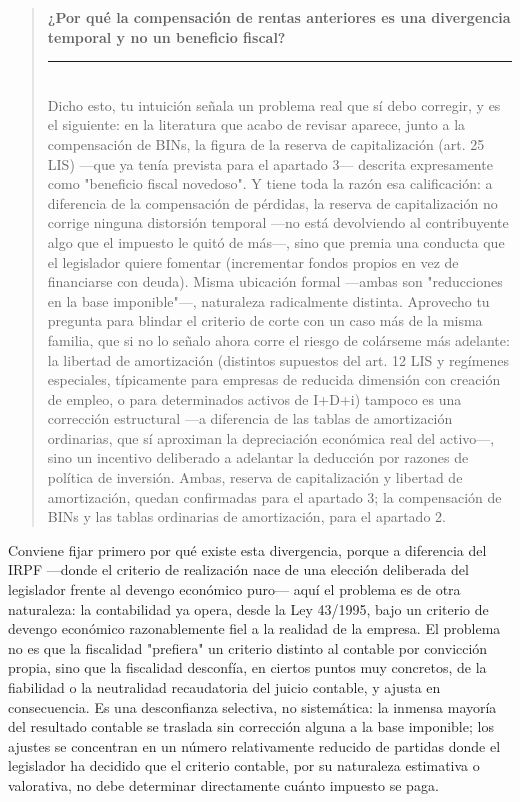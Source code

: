 \documentclass[10pt,a4paper]{article}
\newenvironment{specialblock}[1]{%
      \begin{quote} %
      \small %
      \noindent\textbf{#1}\\[-0.3em] %
      \rule{\linewidth}{0.4pt}\\[0.6em]}{
      \end{quote}}
\begin{document}
\begin{specialblock}{¿Por qué la compensación de rentas anteriores es una divergencia temporal y no un beneficio fiscal?}
    Dicho esto, tu intuición señala un problema real que sí debo corregir, y es el siguiente: en la literatura que acabo de revisar aparece, junto a la compensación de BINs, la figura de la reserva de capitalización (art. 25 LIS) —que ya tenía prevista para el apartado 3— descrita expresamente como "beneficio fiscal novedoso". Y tiene toda la razón esa calificación: a diferencia de la compensación de pérdidas, la reserva de capitalización no corrige ninguna distorsión temporal —no está devolviendo al contribuyente algo que el impuesto le quitó de más—, sino que premia una conducta que el legislador quiere fomentar (incrementar fondos propios en vez de financiarse con deuda). Misma ubicación formal —ambas son "reducciones en la base imponible"—, naturaleza radicalmente distinta. Aprovecho tu pregunta para blindar el criterio de corte con un caso más de la misma familia, que si no lo señalo ahora corre el riesgo de colárseme más adelante: la libertad de amortización (distintos supuestos del art. 12 LIS y regímenes especiales, típicamente para empresas de reducida dimensión con creación de empleo, o para determinados activos de I+D+i) tampoco es una corrección estructural —a diferencia de las tablas de amortización ordinarias, que sí aproximan la depreciación económica real del activo—, sino un incentivo deliberado a adelantar la deducción por razones de política de inversión. Ambas, reserva de capitalización y libertad de amortización, quedan confirmadas para el apartado 3; la compensación de BINs y las tablas ordinarias de amortización, para el apartado 2.
\end{specialblock}


Conviene fijar primero por qué existe esta divergencia, porque a diferencia del IRPF —donde el criterio de realización nace de una elección deliberada del legislador frente al devengo económico puro— aquí el problema es de otra naturaleza: la contabilidad ya opera, desde la Ley 43/1995, bajo un criterio de devengo económico razonablemente fiel a la realidad de la empresa. El problema no es que la fiscalidad "prefiera" un criterio distinto al contable por convicción propia, sino que la fiscalidad desconfía, en ciertos puntos muy concretos, de la fiabilidad o la neutralidad recaudatoria del juicio contable, y ajusta en consecuencia. Es una desconfianza selectiva, no sistemática: la inmensa mayoría del resultado contable se traslada sin corrección alguna a la base imponible; los ajustes se concentran en un número relativamente reducido de partidas donde el legislador ha decidido que el criterio contable, por su naturaleza estimativa o valorativa, no debe determinar directamente cuánto impuesto se paga.
\end{document}
